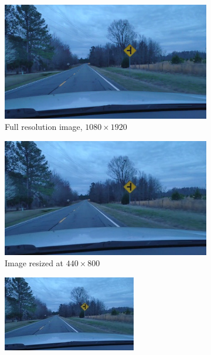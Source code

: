 \begin{figure}
  \begin{center}
    \begin{subfigure}[t]{.49\linewidth}
      \centering
      \includegraphics[width=0.99\linewidth]{figures/im_example_full.jpg}
      \caption{Full resolution image, $1080\times1920$}
    \end{subfigure}
    \begin{subfigure}[t]{.49\linewidth}
      \centering
      \includegraphics[width=0.99\linewidth]{figures/im_example_440x800.jpg}
      \caption{Image resized at $440\times800$}
    \end{subfigure}
    \begin{subfigure}[t]{.49\linewidth}
      \centering
      \includegraphics[width=0.99\linewidth]{figures/im_example_220x400.jpg}

\end{subfigure}
\end{center}
\end{figure}
